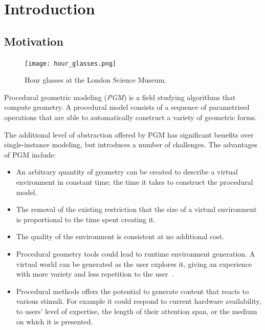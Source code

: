 \chapter{Introduction}
\label{c:intro}

\section{Motivation}

\begin{figure}[htb]
  \centering
  \texttt{[image: hour\_glasses.png]}
  \caption{Hour glasses at the London Science Museum.}
\label{fig:hour_glasses} 
\end{figure}

\graphicspath{{10-introduction/images/}}


Procedural geometric modeling (\emph{PGM}) is a field studying algorithms that compute geometry. A procedural model consists of a sequence of parametrised operations that are able to automatically construct a variety of geometric forms. 

The additional level of abstraction offered by PGM has significant benefits over single-instance modeling, but introduces a number of challenges. The advantages of PGM include:

\begin{itemize}
\item{An arbitrary quantity of geometry can be created to describe a virtual environment in constant time; the time it takes to construct the procedural model.}
\item{The removal of the existing restriction that the size of a virtual environment is proportional to the time spent creating it.}
\item{The quality of the environment is consistent at no additional cost.}
\item{Procedural geometry tools could lead to run­time environment generation. A virtual world can be generated as the user explores it, giving an experience with more variety and less repetition to the user~\cite{Hahn06}}. 
\item{Procedural methods offers the potential to generate content that reacts to various stimuli. For example it could respond to current hardware availability, to users' level of expertise, the length of their attention span, or the medium on which it is presented.}
\end{itemize}

